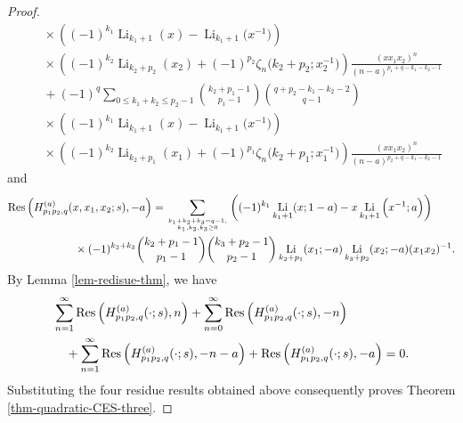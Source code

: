 \documentclass[11pt]{article}
\newcommand\Res{{\rm Res}}
\DeclareMathOperator{\Li}{Li}
\theoremstyle{plain}
\theoremstyle{definition}
\begin{document}
\begin{proof}
\begin{align*}
	&\quad\times\left((-1)^{k_1}\Li_{k_1+1}(x)-\Li_{k_1+1}\Big(x^{-1}\Big)\right)\nonumber\\
	&\quad\times
	\left((-1)^{k_2}\Li_{k_2+p_2}(x_{2})+(-1)^{p_{2}}\zeta_n\Big(k_2+p_{2};x_{2}^{-1}\Big)\right)\frac{(xx_1x_2)^n}{(n-a)^{p_{1}+q-k_1-k_2-1}}\\
	&\quad+(-1)^q\sum_{0\le k_1+k_2\le p_{2}-1}\binom{k_2+p_{1}-1}{p_{1}-1}\binom{q+p_{2}-k_1-k_2-2}{q-1}\nonumber\\
	&\quad\times\left((-1)^{k_1}\Li_{k_1+1}(x)-\Li_{k_1+1}\Big(x^{-1}\Big)\right)\nonumber\\
	&\quad\times
	\left((-1)^{k_2}\Li_{k_2+p_1}(x_{1})+(-1)^{p_{1}}\zeta_n\Big(k_2+p_{1};x_{1}^{-1}\Big)\right)\frac{(xx_1x_2)^n}{(n-a)^{p_{2}+q-k_1-k_2-1}}
\end{align*}
and
\begin{align*}
	&\Res\left(H^{(a)}_{p_1p_2,q}(x,x_1,x_2;s),-a\right)=\sum_{k_1+k_2+k_3=q-1,\atop k_1,k_2,k_3\geq 0}\left((-1)^{k_1}\Li_{{k_1}+1}(x;1-a)-x \Li_{{k_1}+1}\Big(x^{-1};a\Big) \right)\\
	&\qquad\qquad\qquad\times(-1)^{k_2+k_3}\binom{k_2+p_1-1}{p_1-1}\binom{k_3+p_2-1}{p_2-1}\Li_{k_2+p_1}(x_1;-a)\Li_{k_3+p_2}(x_2;-a)(x_1x_2)^{-1}.
\end{align*}
By Lemma \ref{lem-redisue-thm}, we have
\begin{align*}
	&\sum_{n=1}^\infty \Res\left(H^{(a)}_{p_1p_2,q}(\cdot;s),n\right)+\sum_{n=0}^\infty \Res\left(H^{(a)}_{p_1p_2,q}(\cdot;s),-n\right)\\&\quad+\sum_{n=1}^\infty\Res\left(H^{(a)}_{p_1p_2,q}(\cdot;s),-n-a\right)+\Res\left(H^{(a)}_{p_1p_2,q}(\cdot;s),-a\right)=0.
\end{align*}
Substituting the four residue results obtained above consequently proves Theorem \ref{thm-quadratic-CES-three}.
\end{proof}
\end{document}
